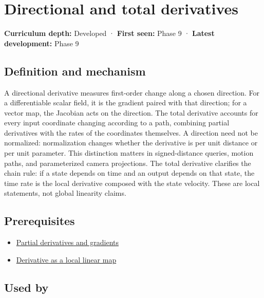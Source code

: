 \hypertarget{appendix-e2d476574aab}{}\label{referencestart:appendix-e2d476574aab}
\section{Directional and total derivatives}\label{appendix-e2d476574aab-directional-and-total-derivatives}

\textbf{Curriculum depth:} Developed · \textbf{First seen:} Phase 9 · \textbf{Latest development:} Phase 9

\subsection{Definition and mechanism}\label{appendix-e2d476574aab-definition-and-mechanism}

A directional derivative measures first-order change along a chosen direction. For a differentiable scalar field, it is the gradient paired with that direction; for a vector map, the Jacobian acts on the direction. The total derivative accounts for every input coordinate changing according to a path, combining partial derivatives with the rates of the coordinates themselves. A direction need not be normalized: normalization changes whether the derivative is per unit distance or per unit parameter. This distinction matters in signed-distance queries, motion paths, and parameterized camera projections. The total derivative clarifies the chain rule: if a state depends on time and an output depends on that state, the time rate is the local derivative composed with the state velocity. These are local statements, not global linearity claims.

\subsection{Prerequisites}\label{appendix-e2d476574aab-prerequisites}

\begin{itemize}
\tightlist
\item
  \hyperref[appendix-677b59746ae0]{Partial derivatives and gradients}
\item
  \hyperref[appendix-7bc181935c42]{Derivative as a local linear map}
\end{itemize}

\subsection{Used by}\label{appendix-e2d476574aab-used-by}

